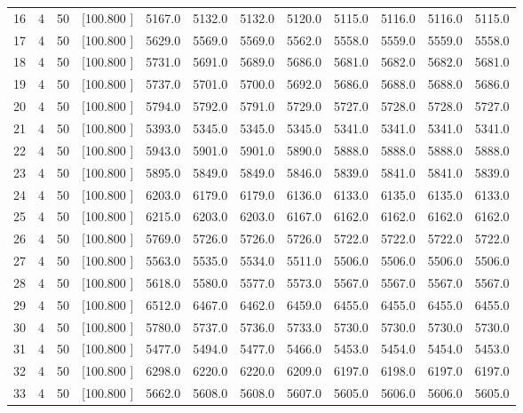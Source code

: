 \documentclass[12pt,a4paper]{article}
\begin{document}
\begin{center}
{\begin{tabular}{r r r r r r r r r r r r}
  16&  4& 50&[100.800   ]&  5167.0&  5132.0&  5132.0&  5120.0&  5115.0&  5116.0&  5116.0&  5115.0\\[-0.02in]
  17&  4& 50&[100.800   ]&  5629.0&  5569.0&  5569.0&  5562.0&  5558.0&  5559.0&  5559.0&  5558.0\\[-0.02in]
  18&  4& 50&[100.800   ]&  5731.0&  5691.0&  5689.0&  5686.0&  5681.0&  5682.0&  5682.0&  5681.0\\[-0.02in]
  19&  4& 50&[100.800   ]&  5737.0&  5701.0&  5700.0&  5692.0&  5686.0&  5688.0&  5688.0&  5686.0\\[-0.02in]
  20&  4& 50&[100.800   ]&  5794.0&  5792.0&  5791.0&  5729.0&  5727.0&  5728.0&  5728.0&  5727.0\\[-0.02in]
  21&  4& 50&[100.800   ]&  5393.0&  5345.0&  5345.0&  5345.0&  5341.0&  5341.0&  5341.0&  5341.0\\[-0.02in]
  22&  4& 50&[100.800   ]&  5943.0&  5901.0&  5901.0&  5890.0&  5888.0&  5888.0&  5888.0&  5888.0\\[-0.02in]
  23&  4& 50&[100.800   ]&  5895.0&  5849.0&  5849.0&  5846.0&  5839.0&  5841.0&  5841.0&  5839.0\\[-0.02in]
  24&  4& 50&[100.800   ]&  6203.0&  6179.0&  6179.0&  6136.0&  6133.0&  6135.0&  6135.0&  6133.0\\[-0.02in]
  25&  4& 50&[100.800   ]&  6215.0&  6203.0&  6203.0&  6167.0&  6162.0&  6162.0&  6162.0&  6162.0\\[-0.02in]
  26&  4& 50&[100.800   ]&  5769.0&  5726.0&  5726.0&  5726.0&  5722.0&  5722.0&  5722.0&  5722.0\\[-0.02in]
  27&  4& 50&[100.800   ]&  5563.0&  5535.0&  5534.0&  5511.0&  5506.0&  5506.0&  5506.0&  5506.0\\[-0.02in]
  28&  4& 50&[100.800   ]&  5618.0&  5580.0&  5577.0&  5573.0&  5567.0&  5567.0&  5567.0&  5567.0\\[-0.02in]
  29&  4& 50&[100.800   ]&  6512.0&  6467.0&  6462.0&  6459.0&  6455.0&  6455.0&  6455.0&  6455.0\\[-0.02in]
  30&  4& 50&[100.800   ]&  5780.0&  5737.0&  5736.0&  5733.0&  5730.0&  5730.0&  5730.0&  5730.0\\[-0.02in]
  31&  4& 50&[100.800   ]&  5477.0&  5494.0&  5477.0&  5466.0&  5453.0&  5454.0&  5454.0&  5453.0\\[-0.02in]
  32&  4& 50&[100.800   ]&  6298.0&  6220.0&  6220.0&  6209.0&  6197.0&  6198.0&  6197.0&  6197.0\\[-0.02in]
  33&  4& 50&[100.800   ]&  5662.0&  5608.0&  5608.0&  5607.0&  5605.0&  5606.0&  5606.0&  5605.0\\[-0.02in]

\end{tabular}}
\end{center}
\end{document}
